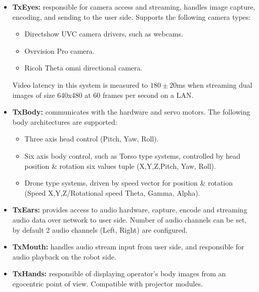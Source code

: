 \begin{itemize}
  \setlength\itemsep{0em}
  \item \textbf{TxEyes:} responsible for camera access and streaming, handles image capture, encoding, and sending to the user side. Supports the following camera types: 
  \begin{itemize}
  \setlength\itemsep{0em}
  \item Directshow UVC camera drivers, such as webcams.
  \item Ovrvision Pro camera.
  \item Ricoh Theta omni directional camera.
  \end{itemize}
  Video latency in this system is measured to $180\pm20$ms when streaming dual images of size 640x480 at 60 frames per second on a LAN.
  \item \textbf{TxBody:} communicates with the hardware and servo motors. The following body architectures are supported:
  \begin{itemize}
  \setlength\itemsep{0em}
  \item Three axis head control (Pitch, Yaw, Roll).
  \item Six axis body control, such as Torso type systems, controlled by head position \& rotation six values tuple (X,Y,Z,Pitch, Yaw, Roll).
  \item Drone type systems, driven by speed vector for position \& rotation (Speed X,Y,Z/Rotational speed Theta, Gamma, Alpha).
  \end{itemize}
  \item \textbf{TxEars:} provides access to audio hardware, capture, encode and streaming audio data over network to user side. Number of audio channels can be set, by default 2 audio channels (Left, Right) are configured.
  \item \textbf{TxMouth:} handles audio stream input from user side, and responsible for audio playback on the robot side.
  \item \textbf{TxHands:} responsible of displaying operator's body images from an egocentric point of view. Compatible with projector modules.
\end{itemize}



